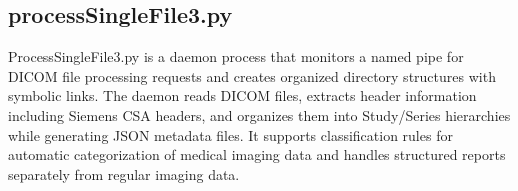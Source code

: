 \documentclass[letterpaper,10pt,english]{sphinxmanual}
\begin{document}
\sphinxstepscope


\subsection{processSingleFile3.py}
\label{\detokenize{Architecture/scripts/processSingleFile3:processsinglefile3-py}}\label{\detokenize{Architecture/scripts/processSingleFile3::doc}}
\sphinxAtStartPar
ProcessSingleFile3.py is a daemon process that monitors a named pipe for DICOM file processing requests and creates organized directory structures with symbolic links. The daemon reads DICOM files, extracts header information including Siemens CSA headers, and organizes them into Study/Series hierarchies while generating JSON metadata files. It supports classification rules for automatic categorization of medical imaging data and handles structured reports separately from regular imaging data.

\sphinxAtStartPar
{}


\sphinxAtStartPar
{}

\end{document}
